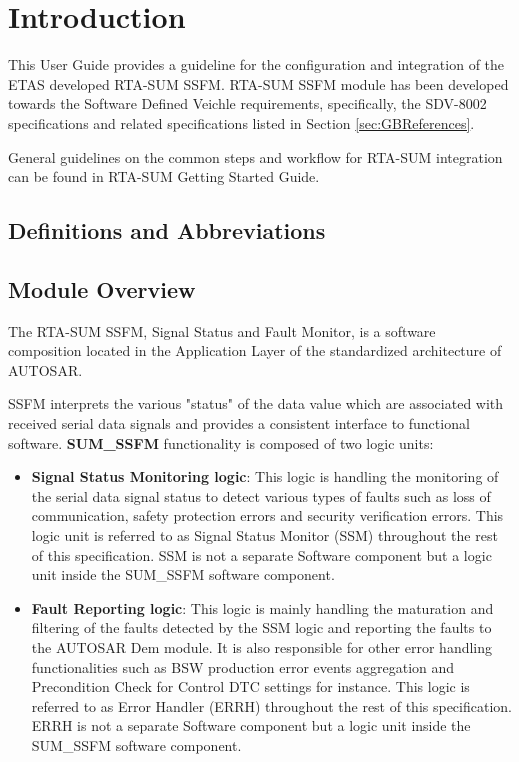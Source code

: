 \chapter{Introduction}

This User Guide provides a guideline for the configuration and integration of the ETAS developed RTA-SUM SSFM. RTA-SUM SSFM module has been developed towards the Software Defined Veichle requirements, specifically, the SDV-8002 specifications and related specifications listed in Section \ref{sec:GBReferences}.

\ifnum {}
{
General guidelines on the common steps and workflow for RTA-SUM integration can be found in RTA-SUM Getting Started Guide.
}
\else
{
}\fi

\section{Definitions and Abbreviations}


\section{Module Overview}
The RTA-SUM SSFM, Signal Status and Fault Monitor, is a software composition located in the Application Layer of the standardized architecture of AUTOSAR.

SSFM interprets the various "status" of the data value which are associated with received serial data signals and provides a consistent interface to functional software. 
\textbf{SUM\_SSFM} functionality is composed of two logic units:
\begin{itemize}
	\item \textbf{Signal Status Monitoring logic}: This logic is handling the monitoring of the serial data signal status to detect various types of faults such as loss of communication, safety protection errors and security verification errors. This logic unit is referred to as Signal Status Monitor (SSM) throughout the rest of this specification. SSM is not a separate Software component but a logic unit inside the SUM\_SSFM software component.
	\item \textbf{Fault Reporting logic}: This logic is mainly handling the maturation and filtering of the faults detected by the SSM logic and reporting the faults to the AUTOSAR Dem module. It is also responsible for other error handling functionalities such as BSW production error events aggregation and Precondition Check for Control DTC settings for instance. This logic is referred to as Error Handler (ERRH) throughout the rest of this specification. ERRH is not a separate Software component but a logic unit inside the SUM\_SSFM software component.
\end{itemize}

